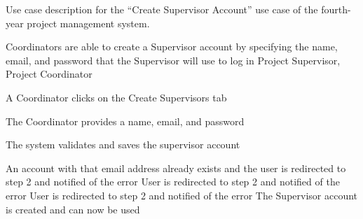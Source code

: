 \documentclass[document.tex]{subfiles}
\begin{document}
\begin{table}[!htbp]
  \centering
  \caption{Use case description for the ``Create Supervisor Account'' use case of the fourth-year project management system.}
  \label{tbl:use-case-create-supervisor}

  \begin{usecase}
    Coordinators are able to create a Supervisor account by specifying the name, email, and password that the Supervisor will use to log in
    Project Supervisor, Project Coordinator
    \ucnormal
    \begin{ucenum}
      \item A Coordinator clicks on the Create Supervisors tab
      \item The Coordinator provides a name, email, and password
      \item The system validates and saves the supervisor account
    \end{ucenum}
    An account with that email address already exists and the user is redirected to step 2 and notified of the error
    User is redirected to step 2 and notified of the error
    User is redirected to step 2 and notified of the error
    The Supervisor account is created and can now be used
  \end{usecase}
\end{table}
\end{document}
